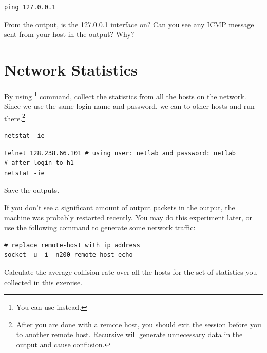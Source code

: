 \documentclass{../UTNetLab}
\begin{document}
\begin{lstlisting}
ping 127.0.0.1
\end{lstlisting}

\begin{report}
    \item From the  output, is the 127.0.0.1 interface on?
    Can you see any ICMP message sent from your host in the  output?
    Why?
\end{report}


\section{Network Statistics}
By using \footnote{You can use  instead.} command, collect the statistics from all the hosts on the network.
Since we use the same login name and password, we can  to other hosts and run  there.\footnote{%
    After you are done with a remote host, you should exit the  session before you  to another remote host.
    Recursive  will generate unnecessary data in the  output and cause confusion.
}

\begin{lstlisting}
netstat -ie
\end{lstlisting}

\begin{lstlisting}[emph=netlab]
telnet 128.238.66.101 # using user: netlab and password: netlab
# after login to h1
netstat -ie
\end{lstlisting}

Save the  outputs.

If you don’t see a significant amount of output packets in the  output, the machine was probably restarted recently.
You may do this experiment later, or use the following  command to generate some network traffic:
\begin{lstlisting}[emph={remote-host},morekeywords={[3]echo}]
# replace remote-host with ip address
socket -u -i -n200 remote-host echo
    \end{lstlisting}

\begin{report}
    \item Calculate the average collision rate over all the hosts for the set of statistics you collected in this exercise.
\end{report}
\end{document}

